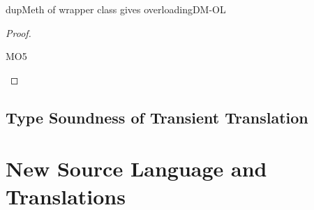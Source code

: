 \documentclass[acmlarge, anonymous, authordraft]{acmart}
\begin{document}
\begin{lemma}{dupMeth of wrapper class gives overloading}{DM-OL}
\begin{proof}
     \begin{case}{MO5}
      \slet{\cmdp}{\cmd, ~\Mdefz\f\t\e}
     \end{case}
     
   \end{proof}
\end{lemma}



\subsection{Type Soundness of Transient Translation}

\section{New Source Language and Translations}
\end{document}
